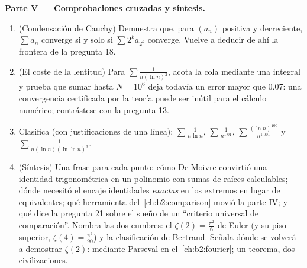 \begin{problem}[{Problema de fin de semana --- $\zeta(2) = \pi^2/6$ y
el panorama de Bertrand}]
\medskip
\noindent\textbf{Parte V --- Comprobaciones cruzadas y síntesis.}
\begin{enumerate}[resume]
  \item (Condensación de Cauchy) Demuestra que, para $(a_n)$
        positiva y decreciente, $\sum a_n$ converge si y solo si
        $\sum 2^k a_{2^k}$ converge. Vuelve a deducir de ahí la
        frontera de la pregunta 18.
  \item (El coste de la lentitud) Para $\sum\frac1{n(\ln n)^2}$,
        acota la cola mediante una integral y prueba que sumar hasta
        $N = 10^6$ deja todavía un error mayor que $0.07$: una
        convergencia certificada por la teoría puede ser inútil para
        el cálculo numérico; contrástese con la pregunta 13.
  \item Clasifica (con justificaciones de una línea):
        $\sum\frac1{n\ln n}$, $\sum\frac1{n^{1.01}}$,
        $\sum\frac{(\ln n)^{100}}{n^{1.001}}$ y
        $\sum\frac1{n(\ln n)(\ln\ln n)^{3}}$.
  \item (Síntesis) Una frase para cada punto: cómo De Moivre
        convirtió una identidad trigonométrica en un polinomio con
        sumas de raíces calculables; dónde necesitó el encaje
        identidades \emph{exactas} en los extremos en lugar de
        equivalentes; qué herramienta del~\cref{ch:b2:comparison}
        movió la parte IV; y qué dice la pregunta 21 sobre el sueño
        de un ``criterio universal de comparación''. Nombra las dos
        cumbres: el $\zeta(2) = \frac{\pi^2}6$ de Euler (y su piso
        superior, $\zeta(4) = \frac{\pi^4}{90}$) y la clasificación
        de Bertrand. Señala dónde se volverá a demostrar $\zeta(2)$:
        mediante Parseval en el~\cref{ch:b2:fourier}; un teorema,
        dos civilizaciones.
\end{enumerate}
\end{problem}
